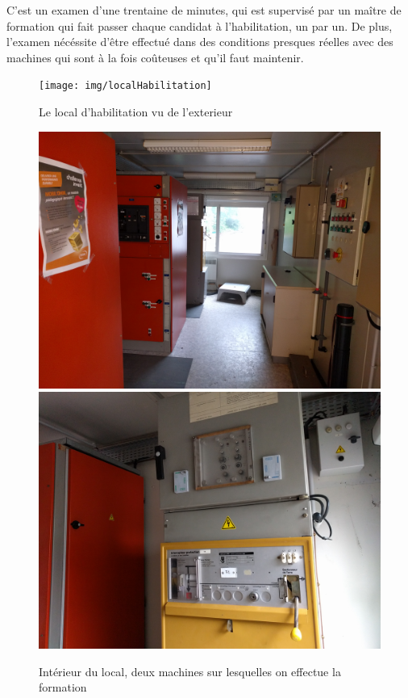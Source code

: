 \documentclass[a4paper]{article}
\begin{document}
        C'est un examen d'une trentaine de minutes, qui est supervisé par un maître de formation qui fait passer chaque candidat à l'habilitation, un par un. De plus, l'examen nécéssite d'être effectué dans des conditions presques réelles avec des machines qui sont à la fois coûteuses et qu'il faut maintenir. \\

        \begin{figure}[H]
            \centering
            \texttt{[image: img/localHabilitation]}
            \caption{Le local d'habilitation vu de l'exterieur}
        \end{figure}

        \begin{figure}[H]
            \centering
            \includegraphics[scale=0.05]{img/habilitation1}
            \includegraphics[scale=0.05]{img/habilitation2}
            \caption{Intérieur du local, deux machines sur lesquelles on effectue la formation}
        \end{figure}
\end{document}
